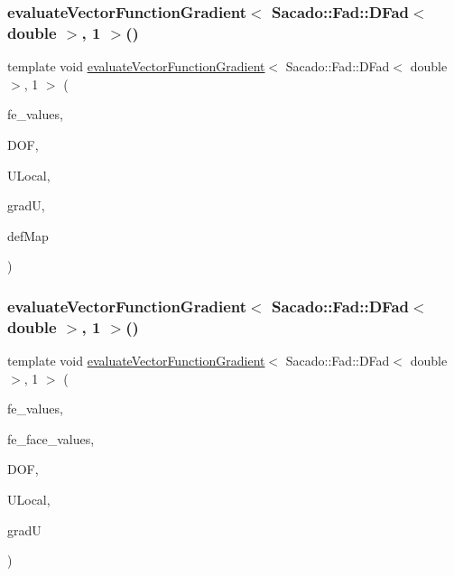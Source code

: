 \subsubsection{\texorpdfstring{evaluateVectorFunctionGradient$<$ Sacado::Fad::DFad$<$ double $>$, 1 $>$()}{evaluateVectorFunctionGradient< Sacado::Fad::DFad< double >, 1 >()}\hspace{0.1cm}{\footnotesize\ttfamily [2/4]}}
{\footnotesize\ttfamily template void \mbox{\hyperlink{group___evaluation_functions_ga9608539d601a91aff1ba01ccc720fbe0}{evaluate\+Vector\+Function\+Gradient}}$<$ Sacado\+::\+Fad\+::\+D\+Fad$<$ double $>$, 1 $>$ (\begin{DoxyParamCaption}\item[{const F\+E\+Values$<$ 1 $>$ \&}]{fe\+\_\+values,  }\item[{unsigned int}]{D\+OF,  }\item[{Table$<$ 1, Sacado\+::\+Fad\+::\+D\+Fad$<$ double $>$$>$ \&}]{U\+Local,  }\item[{Table$<$ 3, Sacado\+::\+Fad\+::\+D\+Fad$<$ double $>$$>$ \&}]{gradU,  }\item[{\mbox{\hyperlink{structdeformation_map}{deformation\+Map}}$<$ Sacado\+::\+Fad\+::\+D\+Fad$<$ double $>$, 1 $>$ \&}]{def\+Map }\end{DoxyParamCaption})}

\mbox{\label{function_evaluations_8cc_a0a0df4cf8cab669622b2a696651aca8b}} 
\subsubsection{\texorpdfstring{evaluateVectorFunctionGradient$<$ Sacado::Fad::DFad$<$ double $>$, 1 $>$()}{evaluateVectorFunctionGradient< Sacado::Fad::DFad< double >, 1 >()}\hspace{0.1cm}{\footnotesize\ttfamily [3/4]}}
{\footnotesize\ttfamily template void \mbox{\hyperlink{group___evaluation_functions_ga9608539d601a91aff1ba01ccc720fbe0}{evaluate\+Vector\+Function\+Gradient}}$<$ Sacado\+::\+Fad\+::\+D\+Fad$<$ double $>$, 1 $>$ (\begin{DoxyParamCaption}\item[{const F\+E\+Values$<$ 1 $>$ \&}]{fe\+\_\+values,  }\item[{const F\+E\+Face\+Values$<$ 1 $>$ \&}]{fe\+\_\+face\+\_\+values,  }\item[{unsigned int}]{D\+OF,  }\item[{Table$<$ 1, Sacado\+::\+Fad\+::\+D\+Fad$<$ double $>$$>$ \&}]{U\+Local,  }\item[{Table$<$ 3, Sacado\+::\+Fad\+::\+D\+Fad$<$ double $>$$>$ \&}]{gradU }\end{DoxyParamCaption})}

